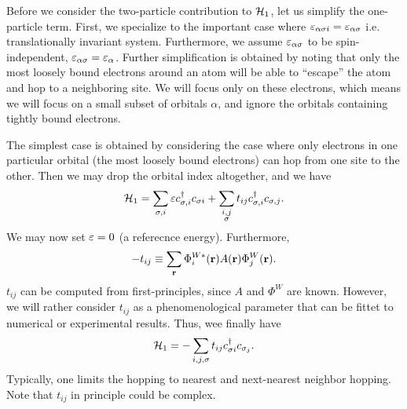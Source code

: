 \begin{center}
\end{center}

Before we consider the two-particle contribution to $\mathcal{H}_1$, let us simplify the one-particle term.
First, we specialize to the important case where $\varepsilon_{\alpha\sigma i} = \varepsilon_{\alpha\sigma}$ i.e. translationally invariant system. Furthermore, we assume $\varepsilon_{\alpha\sigma}$ to be spin-independent, $\varepsilon_{\alpha\sigma} = \varepsilon_{\alpha}$.
Further simplification is obtained by noting that only the most loosely bound electrons around an atom will be able to ``escape'' the atom and hop to a neighboring site. 
We will focus only on these electrons, which means we will focus on a small subset of orbitals $ \alpha  $, and ignore the orbitals containing tightly bound electrons.

The simplest case is obtained by considering the case where only electrons in one particular orbital (the most loosely bound electrons) can hop from one site to the other. 
Then we may drop the orbital index altogether, and we have
\begin{equation}
	\Ha_1 = \sum_{\sigma,i}\ep \cd_{\sigma,i}c_{\sigma i} + \sum_{\mathclap{\substack{i,j\\ \sigma}}}t_{ij}\cd_{\sigma,i}c_{\sigma,j}.
\end{equation}
We may now set $\varepsilon=0$ (a referecnce energy). Furthermore, 
\begin{equation}
	-t_{ij}\equiv \sum_{\vb r}\Phi_{i}^{W*}(\vb r)A(\vb r)\Phi_{j}^{W}(\vb r).
\end{equation}
$t_{ij}$ can be computed from first-principles, since $A$ and $\Phi^{W}$ are known. However, we will rather consider $t_{ij}$ as a phenomenological parameter that can be fittet to numerical or experimental results. 
Thus, wee finally have
\begin{equation}
	\mathcal{H}_1 = -\sum_{i,j,\sigma}t_{ij}c^{\dagger}_{\sigma i}c_{\sigma_j}.
\end{equation}
Typically, one limits the hopping to nearest and next-nearest neighbor hopping. Note that $t_{ij}$ in principle could be complex.

